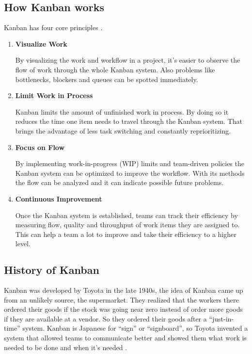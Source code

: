 \subsection{How Kanban works}
Kanban has four core principles \cite{WhatIsKanban}.
\begin{enumerate}
    \item \textbf{Visualize Work}

    By visualizing the work and workflow in a project, it's easier to observe the flow of work through the whole Kanban system. Also problems like bottlenecks, blockers and queues can be spotted immediately.

    \item \textbf{Limit Work in Process}

    Kanban limits the amount of unfinished work in process. By doing so it reduces the time one item needs to travel through the Kanban system. That brings the advantage of less task switching and constantly reprioritizing.

    \item \textbf{Focus on Flow}

    By implementing work-in-progress (WIP) limits and team-driven policies the Kanban system can be optimized to improve the workflow. With its methods the flow can be analyzed and it can indicate possible future problems.

    \item \textbf{Continuous Improvement}

    Once the Kanban system is established, teams can track their efficiency by measuring flow, quality and throughput of work items they are assigned to. This can help a team a lot to improve and take their efficiency to a higher level.
\end{enumerate}

\subsection{History of Kanban}
Kanban was developed by Toyota in the late 1940s, the idea of Kanban came up from an unlikely source, the supermarket. They realized that the workers there ordered their goods if the stock was going near zero instead of order more goods if they are available at a vendor. So they ordered their goods after a ``just-in-time'' system. Kanban is Japanese for ``sign'' or ``signboard'', so Toyota invented a system that allowed teams to communicate better and showed them what work is needed to be done and when it's needed \cite{WhatIsKanban}.

